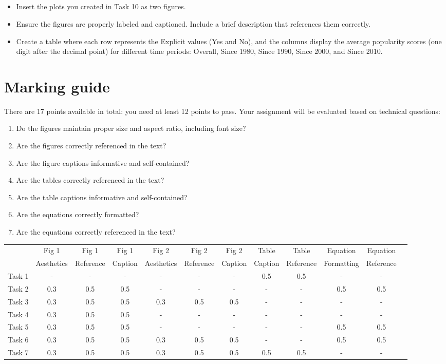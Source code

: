 \documentclass[
	german,
	accentcolor=9c,%
	type=intern,
	marginpar=false
	]{tudapub}
\begin{document}
\subsection{}
\begin{itemize}
\item Insert the plots you created in Task 10 as two figures. 
\item Ensure the figures are properly labeled and captioned. Include a brief description that references them correctly.
\item Create a table where each row represents the Explicit values (Yes and No), and the columns display the average popularity scores (one digit after the decimal point) for different time periods: Overall, Since 1980, Since 1990, Since 2000, and Since 2010.
\end{itemize}

\section{Marking guide}\label{marking_guide}
There are 17 points available in total: you need at least 12 points to pass.
Your assignment will be evaluated based on technical questions:
\begin{enumerate}
\item Do the figures maintain proper size and aspect ratio, including font size?
\item Are the figures correctly referenced in the text?
\item Are the figure captions informative and self-contained?
\item Are the tables correctly referenced in the text?
\item Are the table captions informative and self-contained?
\item Are the equations correctly formatted?
\item Are the equations correctly referenced in the text?
\end{enumerate}


\small
\begin{tabular}{cccccccccccc}
\toprule
 & Fig 1 & Fig 1 & Fig 1 & Fig 2 & Fig 2 & Fig 2 & Table & Table & Equation & Equation \\
  & Aesthetics & Reference & Caption & Aesthetics & Reference & Caption & Caption & Reference & Formatting & Reference \\
\midrule
Task 1 & - & - & - & - & - & - & 0.5 & 0.5 & - & - \\
Task 2 & 0.3 & 0.5 & 0.5 & - & - & - & - & - & 0.5 & 0.5 \\
Task 3 & 0.3 & 0.5 & 0.5 & 0.3 & 0.5 & 0.5 & - & - & - & - \\
Task 4 & 0.3 & 0.5 & 0.5 & - & - & - & - & - & - & - \\
Task 5 & 0.3 & 0.5 & 0.5 & - & - & - & - & - & 0.5 & 0.5 \\
Task 6 & 0.3 & 0.5 & 0.5 & 0.3 & 0.5 & 0.5 & - & - & 0.5 & 0.5 \\
Task 7 & 0.3 & 0.5 & 0.5 & 0.3 & 0.5 & 0.5 & 0.5 & 0.5 & - & - \\
\bottomrule
\end{tabular}
\end{document}
